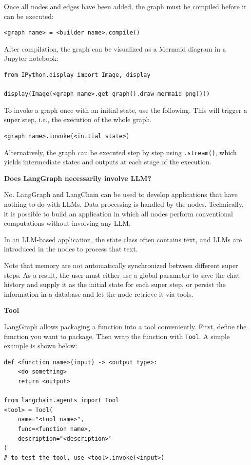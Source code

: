 Once all nodes and edges have been added, the graph must be compiled before it can be executed:
\begin{lstlisting}
<graph name> = <builder name>.compile()
\end{lstlisting}

After compilation, the graph can be visualized as a Mermaid diagram in a Jupyter notebook:
\begin{lstlisting}
from IPython.display import Image, display

display(Image(<graph name>.get_graph().draw_mermaid_png()))
\end{lstlisting}

To invoke a graph once with an initial state, use the following. This will trigger a super step, i.e., the execution of the whole graph.
\begin{lstlisting}
<graph name>.invoke(<initial state>)
\end{lstlisting}
Alternatively, the graph can be executed step by step using \verb|.stream()|, which yields intermediate states and outputs at each stage of the execution.

\begin{mdframed}
\textbf{Does LangGraph necessarily involve LLM?}

No. LangGraph and LangChain can be used to develop applications that have nothing to do with LLMs. Data processing is handled by the nodes. Technically, it is possible to build an application in which all nodes perform conventional computations without involving any LLM.

In an LLM-based application, the state class often contains text, and LLMs are introduced in the nodes to process that text.
\end{mdframed}

Note that memory are not automatically synchronized between different super steps. As a result, the user must either use a global parameter to save the chat history and supply it as the initial state for each super step, or persist the information in a database and let the node retrieve it via tools.

\vspace{0.1in}
\noindent \textbf{Tool}
\vspace{0.1in}

LangGraph allows packaging a function into a tool conveniently. First, define the function you want to package. Then wrap the function with \verb|Tool|. A simple example is shown below:
\begin{lstlisting}
def <function name>(input) -> <output type>:
    <do something>
    return <output>

from langchain.agents import Tool
<tool> = Tool(
    name="<tool name>",
    func=<function name>,
    description="<description>"
)
# to test the tool, use <tool>.invoke(<input>)
\end{lstlisting}

